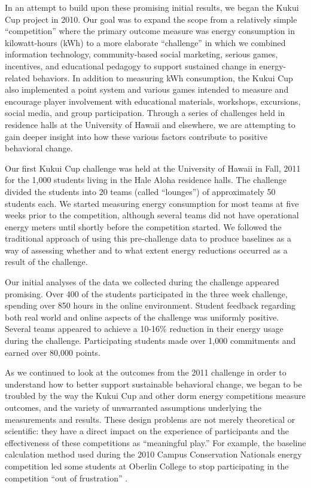 \documentclass[jou]{apa} %
\begin{document}
In an attempt to build upon these promising initial results, we began the Kukui Cup
project in 2010.  Our goal was to expand the scope from a relatively simple ``competition''
where the primary outcome measure was energy consumption in kilowatt-hours (kWh) to a more
elaborate ``challenge'' in which we combined information technology, community-based social
marketing, serious games, incentives, and educational pedagogy to support sustained change
in energy-related behaviors. In addition to measuring kWh consumption, the Kukui Cup also
implemented a point system and various games intended to measure and encourage player involvement with
educational materials, workshops, excursions, social media, and group participation.
Through a series of challenges held in residence halls at the University of Hawaii and
elsewhere, we are attempting to gain deeper insight into how these various factors
contribute to positive behavioral change.

Our first Kukui Cup challenge was held at the University of Hawaii in Fall, 2011 for the
1,000 students living in the Hale Aloha residence halls. The challenge divided the
students into 20 teams (called ``lounges'') of approximately 50 students each.  We started
measuring energy consumption for most teams at five weeks prior to the competition,
although several teams did not have operational energy meters until shortly before the
competition started. We followed the traditional approach of using this pre-challenge data
to produce baselines as a way of assessing whether and to what extent energy reductions
occurred as a result of the challenge.

Our initial analyses of the data we collected during the challenge appeared promising.
Over 400 of the students participated in the three week challenge, spending over 850 hours
in the online environment.  Student feedback regarding both real world and online aspects
of the challenge was uniformly positive.  Several teams appeared to achieve a 10-16\%
reduction in their energy usage during the challenge.  Participating students made over
1,000 commitments and earned over 80,000 points.

As we continued to look at the outcomes from the 2011 challenge in order to understand how
to better support sustainable behavioral change, we began to be troubled by the way the
Kukui Cup and other dorm energy competitions measure outcomes, and the variety of
unwarranted assumptions underlying the measurements and results.  These design problems
are not merely theoretical or scientific: they have a direct impact on the experience of
participants and the effectiveness of these competitions as ``meaningful play.''  For
example, the baseline calculation method used during the 2010 Campus Conservation
Nationals energy competition led some students at Oberlin College to stop participating in
the competition ``out of frustration'' \cite{Willens2010}.
\end{document}
